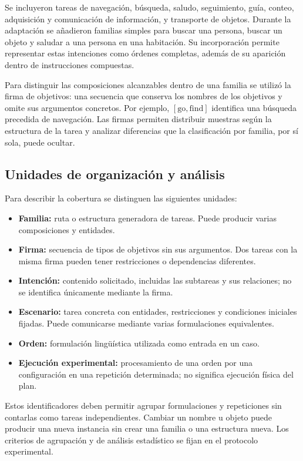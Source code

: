 Se incluyeron tareas de navegación, búsqueda, saludo, seguimiento, guía,
conteo, adquisición y comunicación de información, y transporte de
objetos. Durante la adaptación se añadieron familias simples para buscar
una persona, buscar un objeto y saludar a una persona en una habitación.
Su incorporación permite representar estas intenciones como órdenes
completas, además de su aparición dentro de instrucciones compuestas.

Para distinguir las composiciones alcanzables dentro de una familia se
utilizó la firma de objetivos: una secuencia que conserva los nombres de
los objetivos y omite sus argumentos concretos. Por ejemplo,
\([\mathrm{go},\mathrm{find}]\) identifica una búsqueda precedida de
navegación. Las firmas permiten distribuir muestras según la estructura
de la tarea y analizar diferencias que la clasificación por familia,
por sí sola, puede ocultar.

\subsection{Unidades de organización y análisis}
\label{subsec:unidades_analisis}

Para describir la cobertura se distinguen las siguientes unidades:

\begin{itemize}
    \item \textbf{Familia:} ruta o estructura generadora de tareas. Puede producir varias composiciones y entidades.
    \item \textbf{Firma:} secuencia de tipos de objetivos sin sus argumentos. Dos tareas con la misma firma pueden tener restricciones o dependencias diferentes.
    \item \textbf{Intención:} contenido solicitado, incluidas las subtareas y sus relaciones; no se identifica únicamente mediante la firma.
    \item \textbf{Escenario:} tarea concreta con entidades, restricciones y condiciones iniciales fijadas. Puede comunicarse mediante varias formulaciones equivalentes.
    \item \textbf{Orden:} formulación lingüística utilizada como entrada en un caso.
    \item \textbf{Ejecución experimental:} procesamiento de una orden por una configuración en una repetición determinada; no significa ejecución física del plan.
\end{itemize}

Estos identificadores deben permitir agrupar formulaciones y repeticiones sin contarlas como tareas independientes. Cambiar un nombre u objeto puede producir una nueva instancia sin crear una familia o una estructura nueva. Los criterios de agrupación y de análisis estadístico se fijan en el protocolo experimental.

